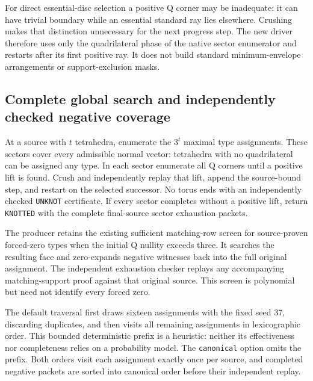 For direct essential-disc selection a positive Q corner may be inadequate:
it can have trivial boundary while an essential standard ray lies elsewhere.
Crushing makes that distinction unnecessary for the next progress step.
The new driver therefore uses only the quadrilateral phase of the native
sector enumerator and restarts after its first positive ray.  It does not
build standard minimum-envelope arrangements or support-exclusion masks.

\subsection{Complete global search and independently checked negative coverage}

At a source with $t$ tetrahedra, enumerate the $3^t$ maximal type assignments.
These sectors cover every admissible normal vector: tetrahedra with no
quadrilateral can be assigned any type.  In each sector enumerate all Q
corners until a positive lift is found.  Crush and independently replay that
lift, append the source-bound step, and restart on the selected successor.
No torus ends with an independently checked \texttt{UNKNOT} certificate.
If every sector completes without a positive lift, return \texttt{KNOTTED}
with the complete final-source sector exhaustion packets.

The producer retains the existing sufficient matching-row screen for
source-proven forced-zero types when the initial Q nullity exceeds three.
It searches the resulting face and zero-expands negative witnesses back
into the full original assignment.  The independent exhaustion checker
replays any accompanying matching-support proof against that original source.
This screen is polynomial but need not identify every forced zero.

The default traversal first draws sixteen assignments with the fixed seed
37, discarding duplicates, and then visits all remaining assignments in
lexicographic order.  This bounded deterministic prefix is a heuristic:
neither its effectiveness nor completeness relies on a probability model.
The \texttt{canonical} option omits the prefix.  Both orders visit each
assignment exactly once per source, and completed negative packets are
sorted into canonical order before their independent replay.

